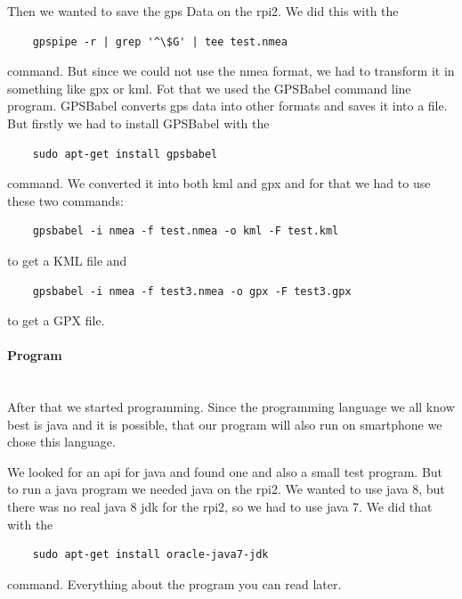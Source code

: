 \newline
Then we wanted to save the \gls{gps} Data on the \gls{rpi2}. We did this with the 
\begin{verbatim}
	gpspipe -r | grep '^\$G' | tee test.nmea 
\end{verbatim}
command.
But since we could not use the \gls{nmea} format, we had to transform it in something like \gls{gpx} or \gls{kml}. Fot that we used the GPSBabel command line program. GPSBabel converts \gls{gps} data into other formats and saves it into a file. But firstly we had to install GPSBabel with the 
\begin{verbatim}
	sudo apt-get install gpsbabel 
\end{verbatim}
command. We converted it into both \gls{kml} and \gls{gpx} and for that we had to use these two commands: 

\begin{verbatim}
	gpsbabel -i nmea -f test.nmea -o kml -F test.kml
\end{verbatim}
to get a KML file and
\begin{verbatim}
	gpsbabel -i nmea -f test3.nmea -o gpx -F test3.gpx
\end{verbatim}
to get a GPX file.
\paragraph{Program} \mbox{}\\
After that we started programming. Since the programming language we all know best is java and it is possible, that our program will also run on smartphone we chose this language. 

We looked for an api for java and found one and also a small test program. \newline
But to run a java program we needed java on the \gls{rpi2}. We wanted to use java 8, but there was no real java 8 jdk for the \gls{rpi2}, so we had to use java 7. We did that with the 
\begin{verbatim}
	sudo apt-get install oracle-java7-jdk
\end{verbatim}
command.\newline
Everything about the program you can read later.

